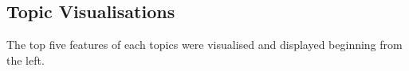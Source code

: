 \documentclass{article}
\begin{document}
\newpage
\begin{appendices}
\section{Topic Visualisations}\label{AppendixVisualisation}
The top five features of each topics were visualised and displayed beginning from the left.

\begin{figure}[h]
\centering
{}\par\medskip
{}\par\medskip    
{}\par\medskip        
{}\par\medskip            
{}

\label{TS}
\end{figure}
\end{appendices}
\end{document}

